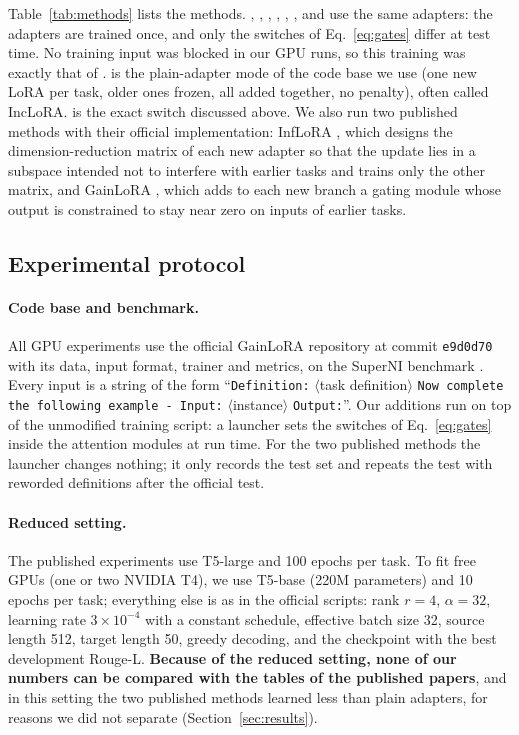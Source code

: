 Table~\ref{tab:methods} lists the methods. \recog{}, \handicap{}, \plain{}, \keyswitch{}, \centre{}, \nearest{}, \cert{} and
\exactfirst{} use the same adapters: the adapters are trained once, and only the switches of
Eq.~\eqref{eq:gates} differ at test time. No training input was blocked in our GPU runs, so this
training was exactly that of \plain{}. \plain{} is the plain-adapter mode of the code base we
use (one new LoRA per task, older ones frozen, all added together, no penalty), often called
IncLoRA. \keyswitch{} is the exact switch discussed above. We also run two published methods with
their official implementation: InfLoRA \citep{liang2024inflora}, which designs the
dimension-reduction matrix of each new adapter so that the update lies in a subspace intended not
to interfere with earlier tasks and trains only the other matrix, and GainLoRA
\citep{liang2025gainlora}, which adds to each new branch a gating module whose output is
constrained to stay near zero on inputs of earlier tasks.

\subsection{Experimental protocol}
\label{sec:protocol}

\paragraph{Code base and benchmark.} All GPU experiments use the official GainLoRA repository at
commit \texttt{e9d0d70} with its data, input format, trainer and metrics, on the SuperNI benchmark
\citep{wang2022superni}. Every input is a string of the form ``\texttt{Definition:}
$\langle$task definition$\rangle$ \texttt{Now complete the following example - Input:}
$\langle$instance$\rangle$ \texttt{Output:}''. Our additions run on top of the unmodified training
script: a launcher sets the switches of Eq.~\eqref{eq:gates} inside the attention modules at run
time. For the two published methods the launcher changes nothing; it only records the test set and
repeats the test with reworded definitions after the official test.

\paragraph{Reduced setting.} The published experiments use T5-large and 100 epochs per task. To fit
free GPUs (one or two NVIDIA T4), we use T5-base \citep{raffel2020t5} (220M parameters) and 10 epochs
per task; everything else is as in the official scripts: rank $r = 4$, $\alpha = 32$, learning rate
$3 \times 10^{-4}$ with a constant schedule, effective batch size 32, source length 512, target
length 50, greedy decoding, and the checkpoint with the best development Rouge-L. \textbf{Because
of the reduced setting, none of our numbers can be compared with the tables of the published
papers}, and in this setting the two published methods learned less than plain adapters, for reasons we did not separate (Section~\ref{sec:results}).

